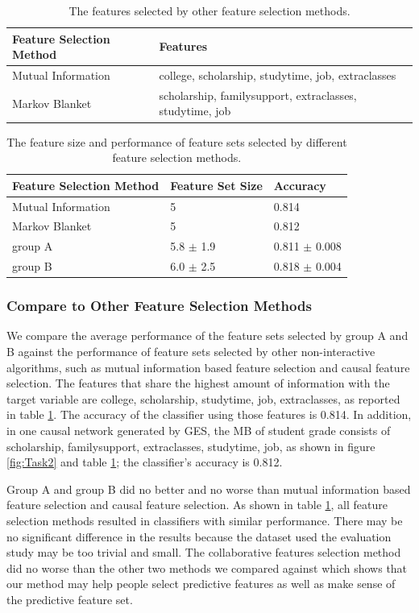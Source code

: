 \begin{table}[]
\centering
\begin{tabular}{ll}
\hline
Feature Selection Method & Features                                                 \\ \hline
Mutual Information       & college, scholarship, studytime, job, extraclasses       \\
Markov Blanket           & scholarship, familysupport, extraclasses, studytime, job \\ \hline
\end{tabular}
\caption{The features selected by other feature selection methods.}
\label{otherFSmethods}
\end{table}

\begin{table}[]
\centering
\begin{tabular}{lll}
\hline
Feature Selection Method & Feature Set Size & Accuracy \\ \hline
Mutual Information       & 5                & 0.814    \\
Markov Blanket           & 5                & 0.812    \\
group A      &  5.8 $\pm$ 1.9    &  0.811 $\pm$ 0.008        \\
group B      &  6.0 $\pm$ 2.5  &    0.818 $\pm$ 0.004        \\\hline
\end{tabular}
\caption{The feature size and performance of feature sets selected by different feature selection methods.}
\label{otherFSperformance}
\end{table}

\subsubsection { Compare to Other Feature Selection Methods }
We compare the average performance of the feature sets selected by group A and B against the performance of feature sets selected by other non-interactive algorithms, such as mutual information based feature selection and causal feature selection. The features that share the highest amount of information with the target variable are college, scholarship, studytime, job, extraclasses, as reported in table \ref{otherFSmethods}. The accuracy of the classifier using those features is 0.814. In addition, in one causal network generated by GES, the MB of student grade consists of scholarship, familysupport, extraclasses, studytime, job, as shown in figure \ref{fig:Task2} and table \ref{otherFSmethods}; the classifier's accuracy is 0.812. 

Group A and group B did no better and no worse than mutual information based feature selection and causal feature selection. As shown in table \ref{otherFSmethods}, all feature selection methods resulted in classifiers with similar performance. There may be no significant difference in the results because the dataset used the evaluation study may be too trivial and small. The collaborative features selection method did no worse than the other two methods we compared against which shows that our method may help people select predictive features as well as make sense of the predictive feature set. 
